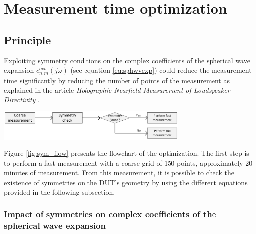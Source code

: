 \documentclass{report}
\begin{document}
\chapter{Measurement time optimization}

\section{Principle}


Exploiting symmetry conditions on the complex coefficients of the spherical wave expansion $c_{n,m}^{out}(j \omega)$ (see equation \ref{eq:sphwvexp}) could reduce the measurement time significantly by reducing the number of points of the measurement as explained in the article \textit{Holographic Nearfield Measurement of Loudspeaker Directivity} \citep[][sect.~4]{aeshs}. \\

\begin{center}
	\includegraphics[width=0.7\textwidth]{Sym/flowchart} 
    \captionsetup{hypcap=false} 
	\label{fig:sym_flow}
\end{center}

Figure \ref{fig:sym_flow} presents the flowchart of the optimization. The first step is to perform a fast measurement with a coarse grid of 150 points, approximately 20 minutes of measurement. From this measurement, it is possible to check the existence of symmetries on the DUT's geometry by using the different equations provided in the following subsection. 

\subsection{Impact of symmetries on complex coefficients of the spherical wave expansion}
\label{chap:sym}
\end{document}
